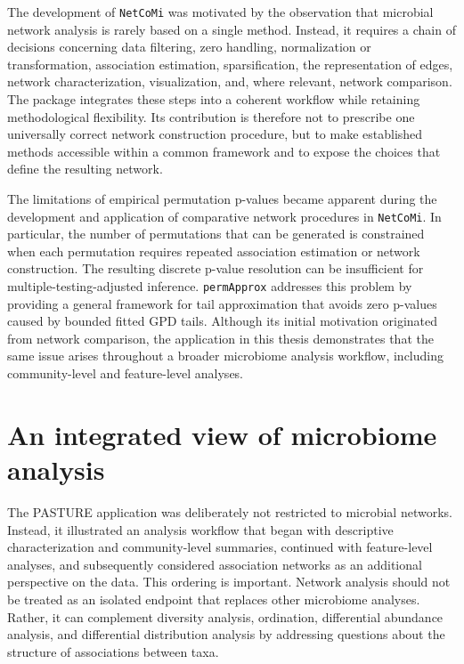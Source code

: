 The development of \texttt{NetCoMi} was motivated by the observation that microbial network analysis is rarely based on a single method. Instead, it requires a chain of decisions concerning data filtering, zero handling, normalization or transformation, association estimation, sparsification, the representation of edges, network characterization, visualization, and, where relevant, network comparison. The package integrates these steps into a coherent workflow while retaining methodological flexibility. Its contribution is therefore not to prescribe one universally correct network construction procedure, but to make established methods accessible within a common framework and to expose the choices that define the resulting network.

The limitations of empirical permutation p-values became apparent during the development and application of comparative network procedures in \texttt{NetCoMi}. In particular, the number of permutations that can be generated is constrained when each permutation requires repeated association estimation or network construction. The resulting discrete p-value resolution can be insufficient for multiple-testing-adjusted inference. \texttt{permApprox} addresses this problem by providing a general framework for tail approximation that avoids zero p-values caused by bounded fitted GPD tails. Although its initial motivation originated from network comparison, the application in this thesis demonstrates that the same issue arises throughout a broader microbiome analysis workflow, including community-level and feature-level analyses.


\section{An integrated view of microbiome analysis}

The PASTURE application was deliberately not restricted to microbial networks. Instead, it illustrated an analysis workflow that began with descriptive characterization and community-level summaries, continued with feature-level analyses, and subsequently considered association networks as an additional perspective on the data. This ordering is important. Network analysis should not be treated as an isolated endpoint that replaces other microbiome analyses. Rather, it can complement diversity analysis, ordination, differential abundance analysis, and differential distribution analysis by addressing questions about the structure of associations between taxa.

